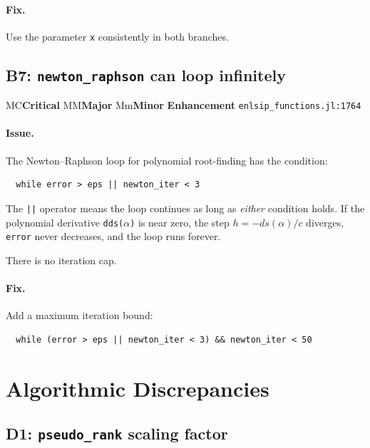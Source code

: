 \documentclass[11pt, a4paper]{article}
\newcommand{\juliaref}[2]{\texttt{#1:#2}}
\newcommand{\severity}[1]{%
  \ifx#1C\colorbox{red!20}{\textbf{Critical}}%
  \else\ifx#1M\colorbox{orange!20}{\textbf{Major}}%
  \else\ifx#1m\colorbox{yellow!20}{\textbf{Minor}}%
  \else\colorbox{blue!10}{\textbf{Enhancement}}%
  \fi\fi\fi%
}
\begin{document}
\paragraph{Fix.}
Use the parameter \texttt{x} consistently in both branches.

\subsection{B7: \texttt{newton\_raphson} can loop infinitely}
\label{sec:b7}

\severity{M} \quad \juliaref{enlsip\_functions.jl}{1764}

\paragraph{Issue.}
The Newton--Raphson loop for polynomial root-finding has the condition:
\begin{lstlisting}
  while error > eps || newton_iter < 3
\end{lstlisting}
The \texttt{||} operator means the loop continues as long as
\emph{either} condition holds.  If the polynomial derivative
\texttt{dds($\alpha$)} is near zero, the step $h = -ds(\alpha)/c$
diverges, \texttt{error} never decreases, and the loop runs forever.

There is no iteration cap.

\paragraph{Fix.}
Add a maximum iteration bound:
\begin{lstlisting}
  while (error > eps || newton_iter < 3) && newton_iter < 50
\end{lstlisting}

\section{Algorithmic Discrepancies}
\label{sec:discrepancies}

\subsection{D1: \texttt{pseudo\_rank} scaling factor}
\label{sec:d1}
\end{document}

